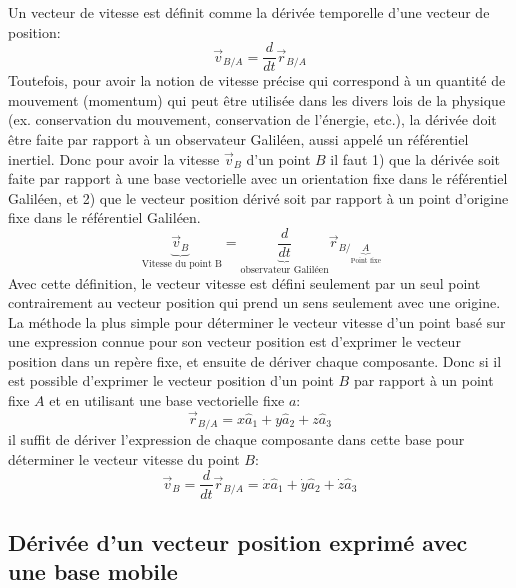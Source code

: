 Un vecteur de vitesse est définit comme la dérivée temporelle d'une vecteur de position:
\begin{equation}
\vec{v}_{B/A} = \frac{d}{dt} \vec{r}_{B/A}
\end{equation}
Toutefois, pour avoir la notion de vitesse précise qui correspond à un quantité de mouvement (momentum) qui peut être utilisée dans les divers lois de la physique (ex. conservation du mouvement, conservation de l'énergie, etc.), la dérivée doit être faite par rapport à un observateur Galiléen, aussi appelé un référentiel inertiel. Donc pour avoir la vitesse $\vec{v}_{B}$ d'un point $B$ il faut 1) que la dérivée soit faite par rapport à une base vectorielle avec un orientation fixe dans le référentiel Galiléen, et 2) que le vecteur position dérivé soit par rapport à un point d'origine fixe dans le référentiel Galiléen.
\begin{equation}
\underbrace{
\vec{v}_{B}
}_{\text{ Vitesse du point B}}
= \underbrace{ 
\frac{d}{dt} 
}_{\text{observateur Galiléen}}
\vec{r}_{B/
\underbrace{A
}_{\text{Point fixe}}
}
\end{equation}
Avec cette définition, le vecteur vitesse est défini seulement par un seul point contrairement au vecteur position qui prend un sens seulement avec une origine.
La méthode la plus simple pour déterminer le vecteur vitesse d'un point basé sur une expression connue pour son vecteur position est d'exprimer le vecteur position dans un repère fixe, et ensuite de dériver chaque composante. Donc si il est possible d'exprimer le vecteur position d'un point $B$ par rapport à un point fixe $A$ et en utilisant une base vectorielle fixe $a$:
\begin{equation}
\vec{r}_{B/A} = x \hat{a}_1 +  y \hat{a}_2 +  z \hat{a}_3
\end{equation}
il suffit de dériver l'expression de chaque composante dans cette base pour déterminer le vecteur vitesse du point $B$:
\begin{equation}
\vec{v}_{B} = \frac{d}{dt} \vec{r}_{B/A} = 
\dot{x} \hat{a}_1 +  \dot{y} \hat{a}_2 +  \dot{z} \hat{a}_3
\end{equation}

\subsection{Dérivée d'un vecteur position exprimé avec une base mobile}
\label{sec:diffposmobilebase}

